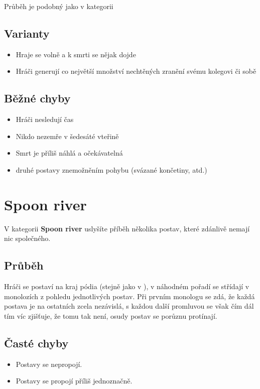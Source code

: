 \documentclass[main.tex]{subfiles}
\begin{document}
Průběh je podobný jako v kategorii  
 
\subsection{ Varianty } \begin{itemize}
\item Hraje se volně a k smrti se nějak dojde
\item Hráči generují co největší množství nechtěných zranění svému kolegovi či sobě
\end{itemize}
 
\subsection{ Běžné chyby } \begin{itemize}
\item Hráči nesledují čas
\item Nikdo nezemře v šedesáté vteřině
\item Smrt je příliš náhlá a očekávatelná
\item {} druhé postavy znemožněním pohybu (svázané končetiny, atd.)
\end{itemize}
 
 
 
 
\needspace{5cm} \section{Spoon river} \label{spoon river}  
V kategorii \textbf{Spoon river}{} uslyšíte příběh několika postav, které zdánlivě nemají nic společného. 
 
\subsection{Průběh} Hráči se postaví na kraj pódia (stejně jako v ), v náhodném pořadí se střídají v monolozích z pohledu jednotlivých postav. 
Při prvním monologu se zdá, že každá postava je na ostatních zcela nezávislá, s každou další promluvou se však čím dál tím víc zjišťuje, že tomu tak není, osudy postav se porůznu protínají. 
 
\subsection{Časté chyby} \begin{itemize}
\item Postavy se nepropojí.
\item Postavy se propojí příliš jednoznačně.
\end{itemize}
 
\end{document}
